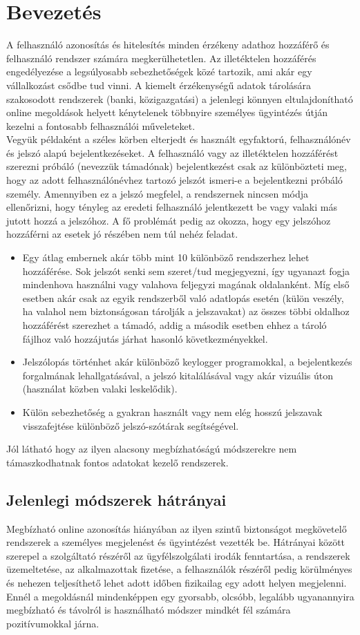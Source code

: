 \section{Bevezetés}
A felhasználó azonosítás és hitelesítés minden érzékeny adathoz hozzáférő és felhasználó rendszer számára megkerülhetetlen. Az illetéktelen hozzáférés engedélyezése a legsúlyosabb sebezhetőségek közé tartozik, ami akár egy vállalkozást csődbe tud vinni.
A kiemelt érzékenységű adatok tárolására szakosodott rendszerek (banki, közigazgatási) a jelenlegi könnyen eltulajdonítható online megoldások helyett kénytelenek többnyire személyes ügyintézés útján kezelni a fontosabb felhasználói műveleteket.
\\
Vegyük példaként a széles körben elterjedt és használt egyfaktorú,  felhasználónév és jelszó alapú bejelentkezéseket. A felhasználó vagy az illetéktelen hozzáférést szerezni próbáló (nevezzük támadónak) bejelentkezést csak az különbözteti meg, hogy az adott felhasználónévhez tartozó jelszót ismeri-e a bejelentkezni próbáló személy. Amennyiben ez a jelszó megfelel, a rendszernek 
nincsen módja ellenőrizni, hogy tényleg az eredeti felhasználó jelentkezett be vagy valaki más jutott hozzá a jelszóhoz. A fő problémát pedig az okozza, hogy egy jelszóhoz hozzáférni az esetek jó részében nem túl nehéz feladat.
\begin{itemize}
\item Egy átlag embernek akár több mint 10 különböző rendszerhez lehet hozzáférése. Sok jelszót senki sem szeret/tud megjegyezni, így ugyanazt fogja mindenhova használni vagy valahova feljegyzi magának oldalanként. Míg első esetben akár csak az egyik rendszerből való adatlopás esetén (külön veszély, ha valahol nem biztonságosan tárolják a jelszavakat) az összes többi oldalhoz hozzáférést
 szerezhet a támadó, addig a második esetben ehhez a tároló fájlhoz való hozzájutás járhat hasonló következményekkel.
\item Jelszólopás történhet akár különböző keylogger programokkal, a bejelentkezés forgalmának lehallgatásával, a jelszó kitalálásával vagy akár vizuális úton (használat közben valaki leskelődik).
\item Külön sebezhetőség a gyakran használt vagy nem elég hosszú jelszavak visszafejtése különböző jelszó-szótárak segítségével.
\end{itemize}
Jól látható hogy az ilyen alacsony megbízhatóságú módszerekre nem támaszkodhatnak fontos adatokat kezelő rendszerek.
\subsection{Jelenlegi módszerek hátrányai}
Megbízható online azonosítás hiányában az ilyen szintű biztonságot megkövetelő rendszerek a személyes megjelenést és ügyintézést vezették be. Hátrányai között szerepel a szolgáltató részéről az ügyfélszolgálati irodák fenntartása, a rendszerek üzemeltetése, az alkalmazottak fizetése, a felhasználók részéről pedig körülményes és nehezen teljesíthető lehet adott időben fizikailag egy adott helyen megjelenni. Ennél a megoldásnál mindenképpen egy gyorsabb, olcsóbb, legalább ugyanannyira megbízható és távolról is használható módszer mindkét fél számára pozitívumokkal járna.
